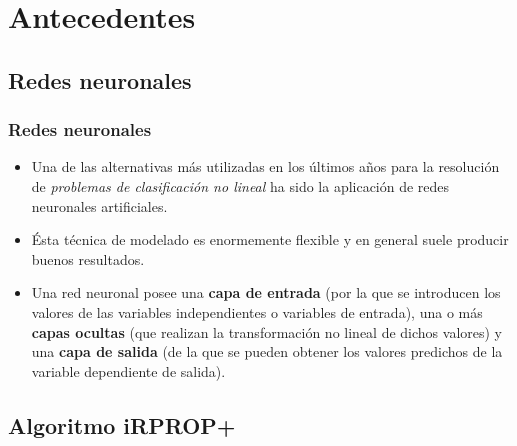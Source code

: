 \documentclass[compress,allowframebreaks]{beamer}
\begin{document}
	\section{Antecedentes}

		\subsection{Redes neuronales}

			\begin{frame}
				\frametitle{\normalsize Redes neuronales}
	
				\begin{itemize}\justifying
					\item Una de las alternativas más utilizadas en los últimos años para la resolución de  \textit{problemas de clasificación no lineal} ha sido la aplicación de redes neuronales artificiales.
					\item Ésta técnica de modelado es enormemente flexible y en general suele producir buenos resultados.
					\item Una red neuronal posee una \textbf{capa de entrada} (por la que se introducen los valores de las variables independientes o variables de entrada), una o más \textbf{capas ocultas} (que realizan la transformación no lineal de dichos valores) y una \textbf{capa de salida} (de la que se pueden obtener los valores predichos de la variable dependiente de salida).
				\end{itemize}
			\end{frame}
		
		\subsection{Algoritmo iRPROP+}
\end{document}
